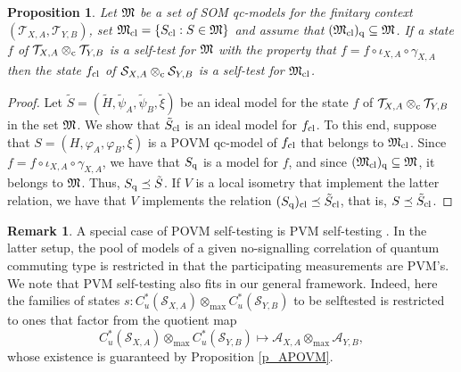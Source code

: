 \documentclass[11pt]{amsart}
\newtheorem{proposition}[theorem]{Proposition}
\theoremstyle{definition}
\newtheorem{remark}[theorem]{Remark}
\newcommand\nph{\varphi}
\newcommand{\cl}[1]{\mathcal{#1}}
\begin{document}
\begin{proposition}\label{p_impliesst}
Let $\frak{M}$ be a set of SOM qc-models for the finitary context
$(\cl T_{X,A},\cl T_{Y,B})$, set
$\frak{M}_{\rm cl} = \{S_{\rm cl} : S\in \frak{M}\}$ and assume that 
$(\frak{M}_{\rm cl})_{\rm q}\subseteq \frak{M}$. 
If a state $f$ of $\cl T_{X,A}\otimes_{\rm c} \cl T_{Y,B}$ is a self-test for $\frak{M}$
with the property that 
$f = f\circ \iota_{X,A}\circ\gamma_{X,A}$
then the state $f_{\rm cl}$ of $\cl S_{X,A}\otimes_{\rm c} \cl S_{Y,B}$ 
is a self-test for $\frak{M}_{\rm cl}$.
\end{proposition}

\begin{proof}
Let $\tilde{S} = (\tilde{H},\tilde{\psi}_A, \tilde{\psi}_B,\tilde{\xi})$ be an ideal model 
for the state $f$ of $\cl T_{X,A}\otimes_{\rm c} \cl T_{Y,B}$ in the set 
$\frak{M}$. 
We show that $\tilde{S}_{\rm cl}$ is an ideal model for $f_{\rm cl}$. To this end,
suppose that $S = (H,\nph_A, \nph_B,\xi)$ is a POVM qc-model of $f_{\rm cl}$ that belongs to 
$\frak{M}_{\rm cl}$. 
Since $f = f\circ \iota_{X,A}\circ\gamma_{X,A}$, we have that 
$S_{\rm q}$ is a model for $f$, and since
$(\frak{M}_{\rm cl})_{\rm q}\subseteq \frak{M}$, it belongs to $\frak{M}$. 
Thus, $S_{\rm q}\preceq \tilde{S}$. 
If $V$ is a local isometry that implement the latter relation, 
we have that $V$ implements the relation
$(S_{\rm q})_{\rm cl}\preceq \tilde{S}_{\rm cl}$, that is, 
$S\preceq \tilde{S}_{\rm cl}$. 
\end{proof}


\begin{remark}\label{r_POVMST}
\rm 
A special case of POVM self-testing is PVM self-testing \cite{pszz}. 
In the latter setup, 
the pool of models of a given no-signalling correlation 
of quantum commuting type is restricted in that the 
participating measurements are PVM's. 
We note that PVM self-testing also fits in our general framework.
Indeed, here the families of states $s : C^*_u(\cl S_{X,A})\otimes_{\max} C^*_u(\cl S_{Y,B})$ to be selftested is restricted to 
ones that factor from the quotient map
$$C^*_u(\cl S_{X,A})\otimes_{\max} C^*_u(\cl S_{Y,B})\mapsto 
\cl A_{X,A}\otimes_{\max} \cl A_{Y,B},$$
whose existence is guaranteed by Proposition \ref{p_APOVM}.
\end{remark}

\end{document}

